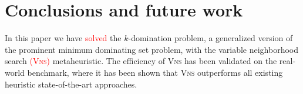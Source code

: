 \documentclass[dvipsnames,format=sigconf]{acmart} %
\begin{document}
\begin{comment}
    
\pgfplotstableread{ %
	City	k1	k2	k4
	Manchester	844.078	1608.695	2584.787
	Nottingham	85.132	1125.304	1827.64
	Belfast	66.681	865.443	1800.359
	Sunderland	44.395	187.461	2464.102
	Leicester	233.02	462.418	1729.272
	Newcastle	88.577	378.578	1147.646
	Leeds	132.67	291.423	1078.052
	Liverpool	192.537	239.716	981.006
	Bristol	129.058	571.793	638.25
	Coventry	144.585	300.407	826.953
	Brighton	89.172	292.017	858.973
	Sheffield	78.21	289.042	850.464
	Plymouth	55.003	205.265	919.927
	Cardiff	41.944	181.9	679.325
	Exeter	52.443	285.106	387.588
	Bath	60.934	256.686	285.744
	Glasgow	90.929	110.067	376.057
	York	28.401	111.923	359.89
	Southampton	7.778	147.781	203.324
	Oxford	18.758	6.93	23.79
}\testdata

\begin{figure}
	\begin{tikzpicture}
		\begin{axis}[
			legend style={legend columns=1,at={(1,1)},anchor=north east},
			xbar stacked,   %
			bar width=5pt,
			ytick=data,     %
			yticklabels from table={\testdata}{City}  %
			]
			\addplot [fill=cyan!20!green!40] table [x=k1, meta=City,y expr=\coordindex] {\testdata};   %
			\addplot [fill=cyan!60!green!20] table [x=k2, meta=City,y expr=\coordindex] {\testdata};
			\addplot [fill=cyan!10] table [x=k4, meta=City,y expr=\coordindex] {\testdata};
			\legend{k=1, k=2,k=4}
		\end{axis}
	\end{tikzpicture}
	\caption{Average times (in seconds) of finding the best solution for small to medium sized instances.}
	\label{fig:timeSmall}  
\end{figure}

\end{comment}

 
\section{Conclusions and future work}

 
 In this paper we have \textcolor{red}{solved} the $k$-domination problem, a generalized version of the prominent minimum dominating set problem, with the variable neighborhood search \textcolor{red}{(\textsc{Vns})} metaheuristic. The efficiency of \textsc{Vns} has been validated on the real-world benchmark, where it has been shown that \textsc{Vns} outperforms all existing heuristic state-of-the-art approaches. 
 
\end{document}
